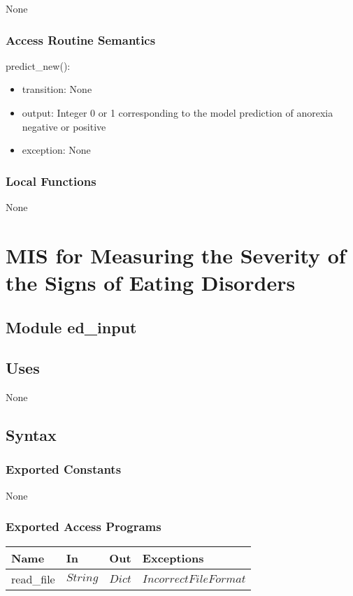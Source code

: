 \documentclass[12pt, titlepage]{article}
\begin{document}
None

\subsubsection{Access Routine Semantics}

\noindent predict\_new():
\begin{itemize}
\item transition: None
\item output: Integer 0 or 1 corresponding to the model prediction of anorexia negative or positive 
\item exception: None
\end{itemize}

\subsubsection{Local Functions}

None

\newpage

\section{MIS for Measuring the Severity of the Signs of Eating Disorders} \label{Module}

\subsection{Module ed\_input}

\subsection{Uses}

None

\subsection{Syntax}

\subsubsection{Exported Constants}

None

\subsubsection{Exported Access Programs}

\begin{center}
\begin{tabular}{p{2cm} p{3cm} p{3cm} p{4cm}}
\hline
\textbf{Name} & \textbf{In} & \textbf{Out} & \textbf{Exceptions} \\
\hline
read\_file & $String$ & $Dict$ & $IncorrectFileFormat$ \\
\hline
\end{tabular}
\end{center}
\end{document}
